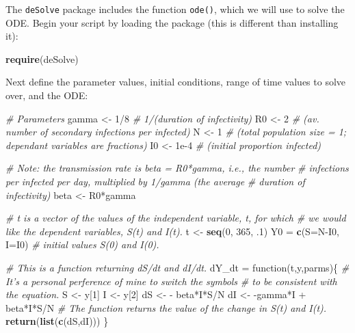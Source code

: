 \documentclass[]{book}
\newenvironment{Shaded}{\begin{snugshade}}{\end{snugshade}}
\newcommand{\KeywordTok}[1]{\textcolor[rgb]{0.13,0.29,0.53}{\textbf{{#1}}}}
\newcommand{\DataTypeTok}[1]{\textcolor[rgb]{0.13,0.29,0.53}{{#1}}}
\newcommand{\DecValTok}[1]{\textcolor[rgb]{0.00,0.00,0.81}{{#1}}}
\newcommand{\FloatTok}[1]{\textcolor[rgb]{0.00,0.00,0.81}{{#1}}}
\newcommand{\StringTok}[1]{\textcolor[rgb]{0.31,0.60,0.02}{{#1}}}
\newcommand{\CommentTok}[1]{\textcolor[rgb]{0.56,0.35,0.01}{\textit{{#1}}}}
\newcommand{\NormalTok}[1]{{#1}}
\begin{document}
The \texttt{deSolve} package includes the function \texttt{ode()}, which
we will use to solve the ODE. Begin your script by loading the package
(this is different than installing it):

\begin{Shaded}
\begin{Highlighting}[]
\KeywordTok{require}\NormalTok{(deSolve)}
\end{Highlighting}
\end{Shaded}

Next define the parameter values, initial conditions, range of time
values to solve over, and the ODE:

\begin{Shaded}
\begin{Highlighting}[]
\CommentTok{# Parameters}
\NormalTok{gamma <-}\StringTok{ }\DecValTok{1}\NormalTok{/}\DecValTok{8} \CommentTok{# 1/(duration of infectivity)}
\NormalTok{R0 <-}\StringTok{ }\DecValTok{2} \CommentTok{# (av. number of secondary infections per infected)}
\NormalTok{N <-}\StringTok{ }\DecValTok{1} \CommentTok{# (total population size = 1; dependant variables are fractions)}
\NormalTok{I0 <-}\StringTok{ }\FloatTok{1e-4} \CommentTok{# (initial proportion infected)}

\CommentTok{# Note: the transmission rate is beta = R0*gamma, i.e., the number}
\CommentTok{# infections per infected per day, multiplied by 1/gamma (the average}
\CommentTok{# duration of infectivity)}
\NormalTok{beta <-}\StringTok{ }\NormalTok{R0*gamma}

\CommentTok{# t is a vector of the values of the independent variable, t, for which}
\CommentTok{# we would like the dependent variables, S(t) and I(t).}
\NormalTok{t <-}\StringTok{ }\KeywordTok{seq}\NormalTok{(}\DecValTok{0}\NormalTok{, }\DecValTok{365}\NormalTok{, .}\DecValTok{1}\NormalTok{) }
\NormalTok{Y0 =}\StringTok{ }\KeywordTok{c}\NormalTok{(}\DataTypeTok{S=}\NormalTok{N-I0, }\DataTypeTok{I=}\NormalTok{I0) }\CommentTok{# initial values S(0) and I(0).}

\CommentTok{# This is a function returning dS/dt and dI/dt.}
\NormalTok{dY_dt =}\StringTok{ }\NormalTok{function(t,y,parms)\{}
  \CommentTok{# It's a personal perference of mine to switch the symbols}
  \CommentTok{# to be consistent with the equation.}
  \NormalTok{S <-}\StringTok{ }\NormalTok{y[}\DecValTok{1}\NormalTok{]}
  \NormalTok{I <-}\StringTok{ }\NormalTok{y[}\DecValTok{2}\NormalTok{]}
 \NormalTok{dS <-}\StringTok{ }\NormalTok{-}\StringTok{ }\NormalTok{beta*I*S/N}
 \NormalTok{dI <-}\StringTok{ }\NormalTok{-gamma*I +}\StringTok{ }\NormalTok{beta*I*S/N }
  \CommentTok{# The function returns the value of the change in S(t) and I(t).}
\KeywordTok{return}\NormalTok{(}\KeywordTok{list}\NormalTok{(}\KeywordTok{c}\NormalTok{(dS,dI)))}
\NormalTok{\}}
\end{Highlighting}
\end{Shaded}
\end{document}
